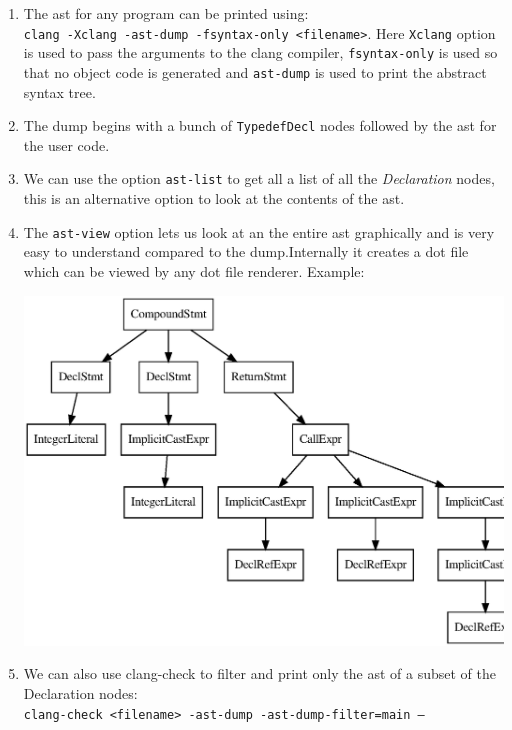 \documentclass[12pt]{article}
\newcommand{\code}{\texttt}
\begin{document}
\begin{enumerate}
\item The ast for any program can be printed using:\\ \code{clang -Xclang -ast-dump -fsyntax-only <filename>}. Here \code{Xclang} option is used to pass the arguments to the clang compiler, \code{fsyntax-only} is used so that no object code is generated and \code{ast-dump} is used to print the abstract syntax tree.
\item The dump begins with a bunch of \code{TypedefDecl} nodes followed by the ast for the user code.
\item We can use the option \code{ast-list} to get all a list of all the \textit{Declaration} nodes, this is an alternative option to look at the contents of the ast.
\item The \code{ast-view} option lets us look at an the entire ast graphically and is very easy to understand compared to the dump.Internally it creates a dot file which can be viewed by any dot file renderer. Example:
\begin{center}
\includegraphics[scale=0.6]{clangExamples/graph.eps}
\end{center}
\item We can also use clang-check to filter and print only the ast of a subset of the Declaration nodes:\\
\code{clang-check <filename> -ast-dump -ast-dump-filter=main --}
\end{enumerate}
\end{document}

